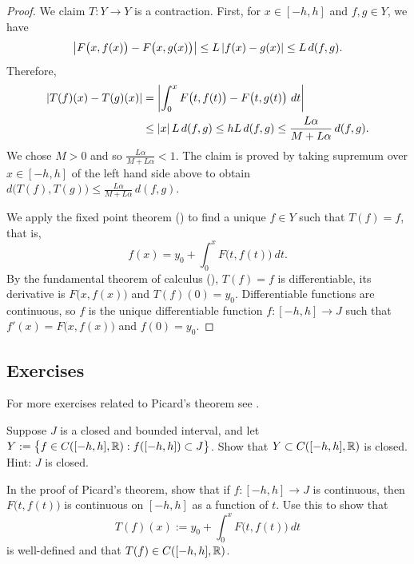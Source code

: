 \begin{proof}
We claim $T \colon Y \to Y$ is a contraction.  First, for $x \in [-h,h]$
and $f,g \in Y$, we have
\begin{equation*}
\left\lvert {F\bigl(x,f(x)\bigr) - F\bigl(x,g(x)\bigr)} \right\rvert \leq
L\left\lvert {f(x)- g(x)} \right\rvert \leq L \, d(f,g) .
\end{equation*}
Therefore,
\begin{equation*}
\begin{split}
\left\lvert {T(f)(x) - T(g)(x)} \right\rvert
&= \left\lvert {\int_0^x F\bigl(t,f(t)\bigr) - F\bigl(t,g(t)\bigr)~dt} \right\rvert \\
& \leq \left\lvert {x} \right\rvert L \, d(f,g)
 \leq h L\, d(f,g)
 \leq \frac{L\alpha}{M+L\alpha} \, d(f,g) .
\end{split}
\end{equation*}
We chose $M > 0$ and so
$\frac{L\alpha}{M+L\alpha} < 1$.  The claim is proved by
taking supremum over $x \in [-h,h]$ of the left hand side above to obtain
$d\bigl(T(f),T(g)\bigr) \leq \frac{L\alpha}{M+L\alpha} \, d(f,g)$.

We apply the fixed point theorem ()
to find a unique $f \in Y$ such that $T(f) = f$, that is,
\begin{equation*} %
f(x) = y_0 + \int_0^x F\bigl(t,f(t)\bigr)~dt .
\end{equation*}
By the fundamental theorem of calculus (),
$T(f) = f$ is differentiable, its derivative is
$F\bigl(x,f(x)\bigr)$ and $T(f)(0) = y_0$.
Differentiable functions are continuous, so
$f$ is the unique differentiable function $f \colon [-h,h] \to J$
such that
 $f'(x) = F\bigl(x,f(x)\bigr)$ and $f(0) = y_0$.
\end{proof}

\subsection{Exercises}

\begin{exnote}
For more exercises related to Picard's theorem see .
\end{exnote}

\begin{exercise}
Suppose $J$ is a closed and bounded interval, and let
$Y := \bigl\{ f \in C([-h,h],{\mathbb{R}}) : f([-h,h]) \subset J \bigr\}$.
Show that $Y \subset C([-h,h],{\mathbb{R}})$ is closed.  Hint: $J$ is closed.
\end{exercise}

\begin{exercise}
In the proof of Picard's theorem,
show that if $f \colon [-h,h] \to J$ is continuous, then $F\bigl(t,f(t)\bigr)$
is continuous on $[-h,h]$ as a function of $t$.  Use this to show that
\begin{equation*}
T(f)(x)
:=
y_0 + \int_0^x F\bigl(t,f(t)\bigr)~dt
\end{equation*}
is well-defined and that $T(f) \in C([-h,h],{\mathbb{R}})$.
\end{exercise}


